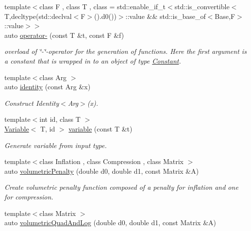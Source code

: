 \begin{DoxyCompactItemize}
{\footnotesize template$<$class F , class T , class  = std\-::enable\-\_\-if\-\_\-t$<$std\-::is\-\_\-convertible$<$\-T,decltype(std\-::declval$<$\-F$>$().\-d0())$>$\-::value \&\&                                     std\-::is\-\_\-base\-\_\-of$<$\-Base,\-F$>$\-::value$>$$>$ }\\auto \hyperlink{namespaceRFFGen_a7b334216a1a47d21c0ecb857ad279580}{operator-\/} (const T \&t, const F \&f)
\begin{DoxyCompactList}\small\item\em overload of \char`\"{}-\/\char`\"{}-\/operator for the generation of functions. Here the first argument is a constant that is wrapped in to an object of type \hyperlink{structRFFGen_1_1Constant}{Constant}. \end{DoxyCompactList}\item 
\hypertarget{namespaceRFFGen_af20942553f30cb8b3a7dc84b9581aeb3}{{\footnotesize template$<$class Arg $>$ }\\auto \hyperlink{namespaceRFFGen_af20942553f30cb8b3a7dc84b9581aeb3}{identity} (const Arg \&x)}\label{namespaceRFFGen_af20942553f30cb8b3a7dc84b9581aeb3}

\begin{DoxyCompactList}\small\item\em Construct Identity$<$\-Arg$>$(x). \end{DoxyCompactList}\item 
\hypertarget{namespaceRFFGen_a9ff332846164ad83741fdb7b7f62a0d6}{{\footnotesize template$<$int id, class T $>$ }\\\hyperlink{structRFFGen_1_1Variable}{Variable}$<$ T, id $>$ \hyperlink{namespaceRFFGen_a9ff332846164ad83741fdb7b7f62a0d6}{variable} (const T \&t)}\label{namespaceRFFGen_a9ff332846164ad83741fdb7b7f62a0d6}

\begin{DoxyCompactList}\small\item\em Generate variable from input type. \end{DoxyCompactList}\item 
\hypertarget{namespaceRFFGen_acecd1bb1423c34a46a1bb55f6c79d65f}{{\footnotesize template$<$class Inflation , class Compression , class Matrix $>$ }\\auto \hyperlink{namespaceRFFGen_acecd1bb1423c34a46a1bb55f6c79d65f}{volumetric\-Penalty} (double d0, double d1, const Matrix \&A)}\label{namespaceRFFGen_acecd1bb1423c34a46a1bb55f6c79d65f}

\begin{DoxyCompactList}\small\item\em Create volumetric penalty function composed of a penalty for inflation and one for compression. \end{DoxyCompactList}\item 
\hypertarget{namespaceRFFGen_a78a0e5bc2796da63afa6a1ce529975e8}{{\footnotesize template$<$class Matrix $>$ }\\auto \hyperlink{namespaceRFFGen_a78a0e5bc2796da63afa6a1ce529975e8}{volumetric\-Quad\-And\-Log} (double d0, double d1, const Matrix \&A)}\label{namespaceRFFGen_a78a0e5bc2796da63afa6a1ce529975e8}


\end{DoxyCompactItemize}
